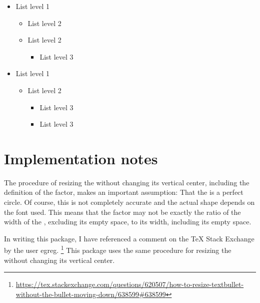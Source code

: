 \documentclass{beery}
\begin{document}
\begingroup
  \newfontfamilysourceseriffour
  \begin{multicols}{2}
    \begin{itemize}
      \item List level 1
      \begin{itemize}
        \item List level 2
        \item List level 2
        \begin{itemize}
          \item List level 3
        \end{itemize}
      \end{itemize}
      \item List level 1
      \begin{itemize}
        \item List level 2
        \begin{itemize}
          \item List level 3
          \item List level 3
        \end{itemize}
      \end{itemize}
    \end{itemize}
  \end{multicols}
\endgroup


\section{Implementation notes}
\label{sec:implementation}

The procedure of resizing the  without changing its vertical center, including the definition of the  factor, makes an important assumption:
That the  is a perfect circle.
Of course, this is not completely accurate and the actual shape depends on the font used.
This means that the  factor may not be exactly the ratio of the width of the , excluding its empty space, to its width, including its empty space.

In writing this package, I have referenced a comment on the \TeX{} Stack Exchange by the user egreg.%
\footnote{\url{https://tex.stackexchange.com/questions/620507/how-to-resize-textbullet-without-the-bullet-moving-down/638599\#638599}}
This package uses the same procedure for resizing the  without changing its vertical center.
\end{document}
